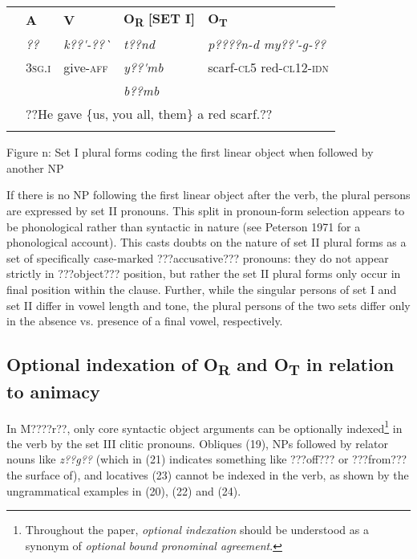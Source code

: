 \documentclass[output=paper]{langsci/langscibook}
\begin{document}
\begin{tabularx}{\textwidth}{XXXXX} & \textbf{A} & \textbf{V} & \textbf{O}\textbf{\textsubscript{R}}\textbf{ [SET I]} & \textbf{O}\textbf{\textsubscript{T}}\textbf{ }\\
\lsptoprule
& \textit{??} & \textit{k??\'{ }-??\`{ }} & \textit{t??nd} & \textit{p????n-d         my??\'{ }-g-??}\\
& 3\textsc{sg.i} & give-\textsc{aff} & \textit{y??\'{ }mb} & scarf-\textsc{cl5}    red-\textsc{cl12-idn}\\
&  &  & \textit{b??mb} & \\
& \multicolumn{4}{l}{??He gave \{us, you all, them\} a red scarf.??

}\\
\lspbottomrule
\end{tabularx}
\begin{table}\caption{
\label{bkm:Ref424143970}Figure n: Set I plural forms coding the first linear object when followed by another NP
}\end{table}

If there is no NP following the first linear object after the verb, the plural persons are expressed by set II pronouns. This split in pronoun-form selection appears to be phonological rather than syntactic in nature (see Peterson 1971 for a phonological account). This casts doubts on the nature of set II plural forms as a set of specifically case-marked ???accusative??? pronouns: they do not appear strictly in ???object??? position, but rather the set II plural forms only occur in final position within the clause. Further, while the singular persons of set I and set II differ in vowel length and tone, the plural persons of the two sets differ only in the absence vs. presence of a final vowel, respectively. 

\subsection{Optional indexation of O\textsubscript{R} and O\textsubscript{T} in relation to animacy}

In M????r??, only core syntactic object arguments can be optionally indexed\footnote{ Throughout the paper, \textit{optional indexation} should be understood as a synonym of \textit{optional bound pronominal agreement}. }{ }in the verb by the set III clitic pronouns. Obliques (19), NPs followed by relator nouns like \emph{z??g??} (which in (21) indicates something like ???off??? or ???from??? the surface of), and locatives (23) cannot be indexed in the verb, as shown by the ungrammatical examples in (20), (22) and (24). 
\end{document}
